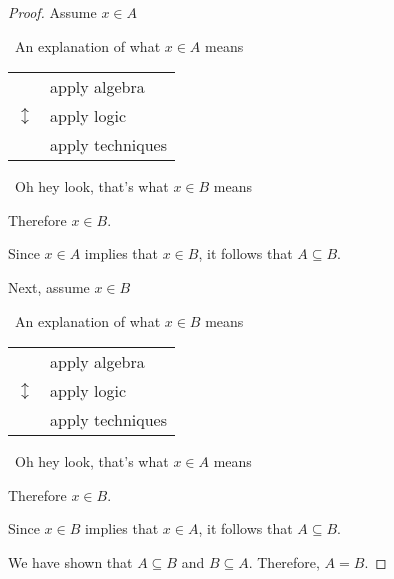 \documentclass{amsart} %
\theoremstyle{definition} %
\theoremstyle{proposition} %
\theoremstyle{remark} %
\begin{document}
\begin{proof}
      Assume $x \in A$

            \begin{center}
                  \guillemotleft\ An explanation of what $ x \in A$ means \guillemotright
            \end{center}

            \begin{center}
            \begin{tabular}{r l}
                  \multirow{3}{*}{\huge $\updownarrow$} & apply algebra \\
                  & apply logic \\
                  & apply techniques \\
            \end{tabular}
            \end{center}

            \begin{center}
                  \guillemotleft\ Oh hey look, that's what $x \in B$ means \guillemotright
            \end{center}

            Therefore $x \in B$.

            Since $x \in A$ implies that $x \in B$, it follows that $A \subseteq B$.

            \bigskip

            Next, assume $x \in B$

            \begin{center}
                  \guillemotleft\ An explanation of what $ x \in B$ means \guillemotright
            \end{center}

            \begin{center}
            \begin{tabular}{r l}
                  \multirow{3}{*}{\huge $\updownarrow$} & apply algebra \\
                  & apply logic \\
                  & apply techniques \\
            \end{tabular}
            \end{center}

            \begin{center}
                  \guillemotleft\ Oh hey look, that's what $x \in A$ means \guillemotright
            \end{center}

            Therefore $x \in B$.

            Since $x \in B$ implies that $x \in A$, it follows that $A \subseteq B$.


            We have shown that $A \subseteq B$ and $B \subseteq A$. Therefore, $A = B$.

\end{proof}
\end{document}
